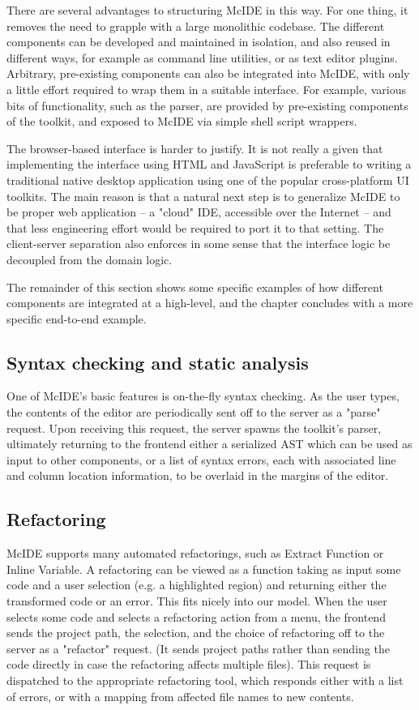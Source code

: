There are several advantages to structuring McIDE in this way. For one thing,
it removes the need to grapple with a large monolithic codebase. The different
components can be developed and maintained in isolation, and also reused in
different ways, for example as command line utilities, or as text editor
plugins. Arbitrary, pre-existing components can also be integrated into McIDE,
with only a little effort required to wrap them in a suitable interface. For
example, various bits of functionality, such as the parser, are provided by
pre-existing components of the \mclab toolkit, and exposed to McIDE via simple
shell script wrappers.

The browser-based interface is harder to justify. It is not really a given that
implementing the interface using HTML and JavaScript is preferable to writing a
traditional native desktop application using one of the popular cross-platform
UI toolkits. The main reason is that a natural next step is to generalize McIDE
to be proper web application -- a "cloud" IDE, accessible over the Internet --
and that less engineering effort would be required to port it to that setting.
The client-server separation also enforces in some sense that the interface
logic be decoupled from the domain logic.

The remainder of this section shows some specific examples of how different
components are integrated at a high-level, and the chapter concludes with a
more specific end-to-end example.

\subsection{Syntax checking and static analysis}

One of McIDE's basic features is on-the-fly syntax checking. As the user types,
the contents of the editor are periodically sent off to the server as a "parse"
request. Upon receiving this request, the server spawns the \mclab toolkit's
\matlab parser, ultimately returning to the frontend either a serialized AST
which can be used as input to other components, or a list of syntax errors,
each with associated line and column location information, to be overlaid in
the margins of the editor.

\subsection{Refactoring}

McIDE supports many automated refactorings, such as Extract Function or Inline
Variable. A refactoring can be viewed as a function taking as input some code
and a user selection (e.g. a highlighted region) and returning either the
transformed code or an error. This fits nicely into our model. When the user
selects some code and selects a refactoring action from a menu, the frontend
sends the project path, the selection, and the choice of refactoring off to the
server as a "refactor" request. (It sends project paths rather than sending the
code directly in case the refactoring affects multiple files). This request is
dispatched to the appropriate refactoring tool, which responds either with a
list of errors, or with a mapping from affected file names to new contents.

